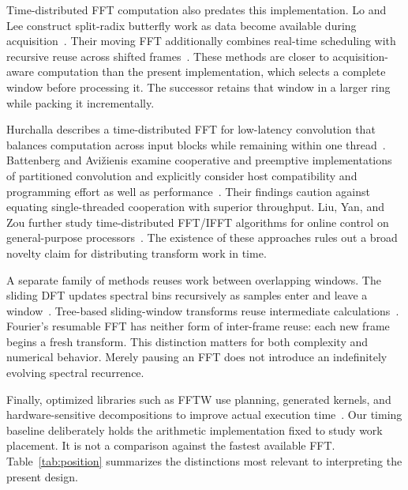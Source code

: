 \documentclass[11pt,letterpaper]{article}
\begin{document}
Time-distributed FFT computation also predates this implementation. Lo and Lee
construct split-radix butterfly work as data become available during
acquisition~\cite{lo1998,lo1999}. Their moving FFT additionally combines
real-time scheduling with recursive reuse across shifted
frames~\cite{lomoving1999}. These methods are closer to acquisition-aware
computation than the present implementation, which selects a complete
window before processing it. The successor retains that window in a larger
ring while packing it incrementally.

Hurchalla describes a time-distributed FFT for low-latency convolution that
balances computation across input blocks while remaining within one
thread~\cite{hurchalla2010}. Battenberg and Avi\v{z}ienis examine cooperative
and preemptive implementations of partitioned convolution and explicitly
consider host compatibility and programming effort as well as
performance~\cite{battenberg2011}. Their findings caution against equating
single-threaded cooperation with superior throughput. Liu, Yan, and Zou
further study time-distributed FFT/IFFT algorithms for online control on
general-purpose processors~\cite{liu2017}. The existence of these approaches
rules out a broad novelty claim for distributing transform work in time.

A separate family of methods reuses work between overlapping windows.
The sliding DFT updates spectral bins recursively as samples enter and leave a
window~\cite{jacobsen2003,jacobsen2015}. Tree-based sliding-window transforms
reuse intermediate calculations~\cite{richardson2019}. Fourier's resumable FFT
has neither form of inter-frame reuse: each new frame begins a fresh transform.
This distinction matters for both complexity and numerical behavior. Merely
pausing an FFT does not introduce an indefinitely evolving spectral recurrence.

Finally, optimized libraries such as FFTW use planning, generated kernels, and
hardware-sensitive decompositions to improve actual execution
time~\cite{frigo2005}. Our timing baseline deliberately holds the arithmetic
implementation fixed to study work placement. It is not a comparison against
the fastest available FFT. Table~\ref{tab:position} summarizes the distinctions
most relevant to interpreting the present design.
\end{document}
